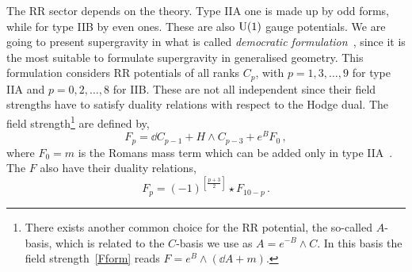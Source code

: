 \documentclass[debug]{phd}
\begin{document}
				The RR sector depends on the theory.
				Type IIA one is made up by odd forms, while for type IIB by even ones.
				These are also $\mathrm{U}(1)$ gauge potentials.
				We are going to present supergravity in what is called \emph{democratic formulation}~\cite{DemSugra}, since it is the most suitable to formulate supergravity in generalised geometry.
				This formulation considers RR potentials of all ranks $C_p$, with $p = 1, 3, \ldots, 9$ for type IIA and $p = 0, 2, \ldots, 8$ for IIB. 
				These are not all independent since their field strengths have to satisfy duality relations with respect to the Hodge dual.
				The field strength\footnote{%
					There exists another common choice for the RR potential, the so-called $A$-basis, which is related to the $C$-basis we use as $A = e^{-B} \wedge C$. 
					In this basis the field strength~\eqref{Fform} reads $F = e^B \wedge (\dd A + m)$.%
					}
				are defined by,
						\begin{equation}\label{Fform}
							F_p = \dd C_{p-1} + H \wedge C_{p-3} + e^B F_0 \, ,
						\end{equation}
				where $F_0 = m$ is the Romans mass term which can be added only in type IIA~\cite{RomansMass}.
				The $F$ also have their duality relations,
						\begin{equation}\label{Fdual}
							F_p = (-1)^{\left[\frac{p+3}{2}\right]} \star F_{10-p} \, .
						\end{equation}
				
\end{document}
